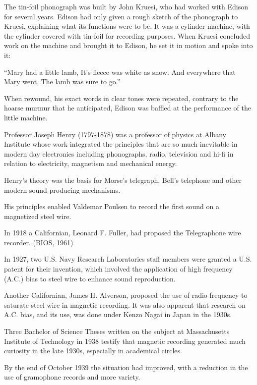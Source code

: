 \documentclass[UKenglish]{ifimaster}  %
\begin{document}
The tin-foil phonograph was built by John Kruesi, who had worked with
Edison for several years.  Edison had only given a rough sketch of
the phonograph to Kruesi, explaining what its functions were to be.
It was a cylinder machine, with the cylinder covered with tin-foil for
recording purposes.  When Kruesi concluded work on the machine and
brought it to Edison, he set it in motion and spoke into it:

``Mary had a little lamb,
It's fleece was white as snow.
And everywhere that Mary went,
The lamb was sure to go.''

When rewound, his exact words in clear tones were repeated, contrary
to the hoarse murmur that he anticipated, Edison was baffled at the
performance of the little machine.

Professor Joseph Henry (1797-1878) was a professor of physics at
Albany Institute whose work integrated the principles that are so much
inevitable in modern day electronics including phonographs, radio,
television and hi-fi in relation to electricity, magnetism and
mechanical energy.

Henry's theory was the basis for Morse's telegraph, Bell's telephone
and other modern sound-producing mechanisms.

His principles enabled Valdemar Poulsen to record the first sound on a
magnetized steel wire.

In 1918 a Californian, Leonard F. Fuller, had proposed the
Telegraphone wire recorder. ({BIOS, 1961})

In 1927, two U.S. Navy Research Laboratories staff members were
granted a U.S. patent for their invention, which involved the
application of high frequency (A.C.) bias to steel wire to enhance
sound reproduction.

Another Californian, James H. Alverson, proposed the use of radio
frequency to saturate steel wire in magnetic recording.  It was also
apparent that research on A.C. bias, and its use, was done under Kenzo
Nagai in Japan in the 1930s.

Three Bachelor of Science Theses written on the subject at
Massachusetts Institute of Technology in 1938 testify that magnetic
recording generated much curiosity in the late 1930s, especially in
academical circles.

By the end of October 1939 the situation had improved, with a
reduction in the use of gramophone records and more variety.
\end{document}
